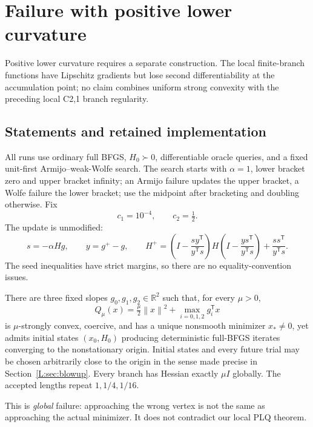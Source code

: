 \chapter{Failure with positive lower curvature}\label{comp:L}\label{L:chapter}
\renewcommand{\ModuleTag}{13}
Positive lower curvature requires a separate construction. The local finite-branch functions have Lipschitz gradients but lose second differentiability at the accumulation point; no claim combines uniform strong convexity with the preceding local C2,1 branch regularity.


\begingroup
\providecommand{\R}{}
\renewcommand{\R}{\mathbb R}
\providecommand{\T}{}
\renewcommand{\T}{^{\mathsf T}}
\providecommand{\norm}{}
\renewcommand{\norm}[1]{\left\lVert#1\right\rVert}
\providecommand{\ip}{}
\renewcommand{\ip}[2]{\langle #1,#2\rangle}
\setcounter{section}{0}
\setcounter{theorem}{0}
\setcounter{lemma}{0}
\setcounter{corollary}{0}
\setcounter{proposition}{0}
\setcounter{remark}{0}
\setcounter{equation}{0}


\section{Statements and retained implementation}

All runs use ordinary full BFGS, $H_0\succ0$, differentiable oracle queries, and a fixed unit-first Armijo--weak-Wolfe search. The search starts with $\alpha=1$, lower bracket zero and upper bracket infinity; an Armijo failure updates the upper bracket, a Wolfe failure the lower bracket; use the midpoint after bracketing and doubling otherwise. Fix
\[
 c_1=10^{-4},\qquad c_2=\tfrac12.
\]
The update is unmodified:
\[
 s=-\alpha Hg,\qquad y=g^+-g,\qquad
 H^+=\left(I-\frac{sy\T}{y\T s}\right)H
 \left(I-\frac{ys\T}{y\T s}\right)+\frac{ss\T}{y\T s}.
\]
The seed inequalities have strict margins, so there are no equality-convention issues.

\begin{theorem}\label{L:thm:global}
There are three fixed slopes $g_0,g_1,g_2\in\R^2$ such that, for every $\mu>0$,
\[
 Q_\mu(x)=\tfrac\mu2\norm{x}^2+\max_{i=0,1,2}g_i\T x
\]
is $\mu$-strongly convex, coercive, and has a unique nonsmooth minimizer $x_*\ne0$, yet admits initial states $(x_0,H_0)$ producing deterministic full-BFGS iterates converging to the nonstationary origin. Initial states and every future trial may be chosen arbitrarily close to the origin in the sense made precise in Section~\ref{L:sec:blowup}. Every branch has Hessian exactly $\mu I$ globally. The accepted lengths repeat $1,1/4,1/16$.
\end{theorem}
\noindent This is \emph{global} failure: approaching the wrong vertex is not the same as approaching the actual minimizer. It does not contradict our local PLQ theorem.


